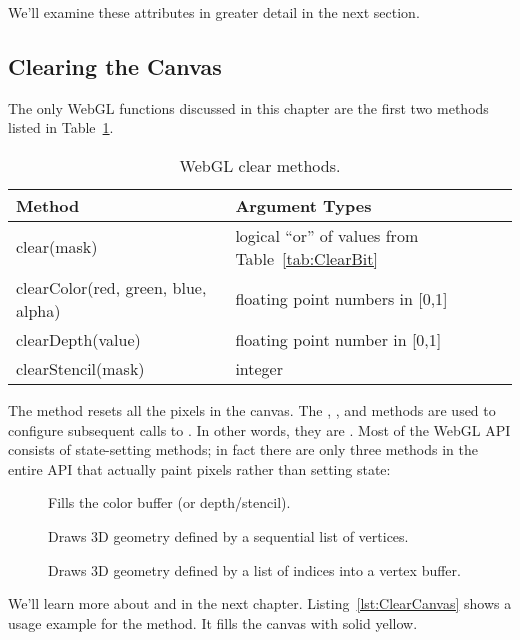 We'll examine these attributes in greater detail in the next section.


\subsection{Clearing the Canvas}

The only WebGL functions discussed in this chapter are the first two methods listed in Table~\ref{tab:Clearing}.

\begin{table}[htb]\centering
  \begin{tabular}{ll}
    \hline
    Method & Argument Types \\
    \hline
    clear(mask) & logical ``or'' of values from Table~\ref{tab:ClearBit} \\
    clearColor(red, green, blue, alpha)  & floating point numbers in [0,1] \\
    clearDepth(value) & floating point number in [0,1] \\
    clearStencil(mask) & integer \\
    \hline
  \end{tabular}
  \caption{WebGL clear methods.}
  \label{tab:Clearing}
\end{table}

The  method resets all the pixels in the canvas.  The , , and  methods are used to configure subsequent calls to .  In other words, they are .  Most of the WebGL API consists of state-setting methods; in fact there are only three methods in the entire API that actually paint pixels rather than setting state:

\begin{description}
\item[] Fills the color buffer (or depth/stencil).
\item[] Draws 3D geometry defined by a sequential list of vertices.
\item[] Draws 3D geometry defined by a list of indices into a vertex buffer.
\end{description}

We'll learn more about  and  in the next chapter.  Listing~\ref{lst:ClearCanvas} shows a usage example for the  method.  It fills the canvas with solid yellow.


